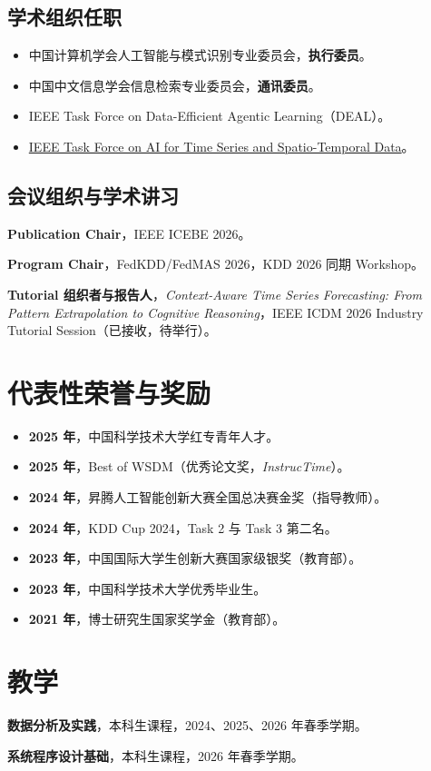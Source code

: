 \documentclass[UTF8,fontset=fandol,scheme=plain,11pt,a4paper]{ctexart}
\begin{document}
\subsection{学术组织任职}
\begin{itemize}[itemsep=4pt]
\item 中国计算机学会人工智能与模式识别专业委员会，\textbf{执行委员}。
\item 中国中文信息学会信息检索专业委员会，\textbf{通讯委员}。
\item IEEE Task Force on Data-Efficient Agentic Learning（DEAL）。
\item \href{https://cis.taskforce.ieee.org/ai4tst/}{IEEE Task Force on AI for Time Series and Spatio-Temporal Data}。
\end{itemize}
\subsection{会议组织与学术讲习}
\textbf{Publication Chair}，IEEE ICEBE 2026。

\textbf{Program Chair}，FedKDD/FedMAS 2026，KDD 2026 同期 Workshop。

\textbf{Tutorial 组织者与报告人}，\emph{Context-Aware Time Series Forecasting: From Pattern Extrapolation to Cognitive Reasoning}，IEEE ICDM 2026 Industry Tutorial Session（已接收，待举行）。
\section{代表性荣誉与奖励}
\begin{itemize}[itemsep=4pt]
\item \textbf{2025 年}，中国科学技术大学红专青年人才。
\item \textbf{2025 年}，Best of WSDM（优秀论文奖，\textit{InstrucTime}）。
\item \textbf{2024 年}，{\rarehan 昇}腾人工智能创新大赛全国总决赛金奖（指导教师）。
\item \textbf{2024 年}，KDD Cup 2024，Task 2 与 Task 3 第二名。
\item \textbf{2023 年}，中国国际大学生创新大赛国家级银奖（教育部）。
\item \textbf{2023 年}，中国科学技术大学优秀毕业生。
\item \textbf{2021 年}，博士研究生国家奖学金（教育部）。
\end{itemize}
\section{教学}
\textbf{数据分析及实践}，本科生课程，2024、2025、2026 年春季学期。

\textbf{系统程序设计基础}，本科生课程，2026 年春季学期。
\end{document}
